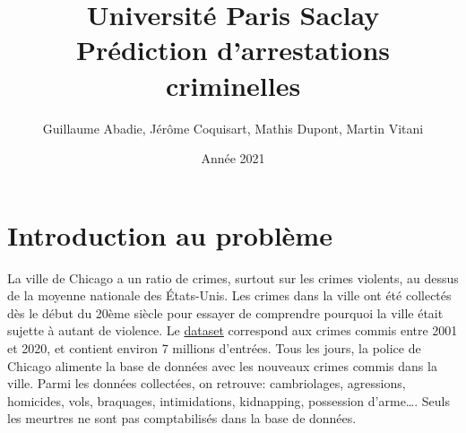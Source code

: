 \documentclass{article}
\title{\textbf{\Huge  Université Paris Saclay}\\ Prédiction d'arrestations criminelles}
\author{Guillaume Abadie, Jérôme Coquisart, Mathis Dupont, Martin Vitani}
\date{Année 2021}
\begin{document}
    \maketitle
    \tableofcontents

    \section{Introduction au problème}
    La ville de Chicago a un ratio de crimes, surtout sur les crimes violents,
    au dessus de la moyenne nationale des États-Unis.
    Les crimes dans la ville ont été collectés dès le début du 20ème siècle pour
    essayer de comprendre pourquoi la ville était sujette à autant de violence.
    Le \href{https://www.kaggle.com/n3v375/chicago-crime-from-01jan2001-to-22jul2020}{dataset} correspond aux crimes commis entre 2001 et 2020, et contient environ 
    7 millions d'entrées.
    Tous les jours, la police de Chicago alimente la base de données avec les
    nouveaux crimes commis dans la ville. 
    Parmi les données collectées, on retrouve: 
    cambriolages, agressions, homicides, vols, braquages, intimidations, kidnapping, 
    possession d'arme\dots.
    Seuls les meurtres ne sont pas comptabilisés dans la base de données.
\end{document}
